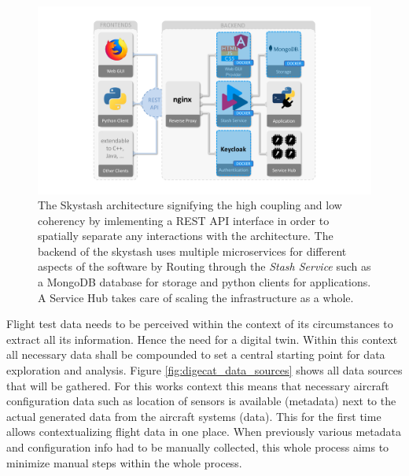 \begin{figure}[h]
    \centering
    \includegraphics[width=\textwidth]{03_figures/stash_architecture}
    \caption[The Skystash architecture \cite{arts_digital_2022}]{The Skystash architecture signifying the high coupling and low coherency by imlementing a REST API interface in order to spatially separate any interactions with the architecture. The backend of the skystash uses multiple microservices for different aspects of the software by Routing through the \textit{Stash Service} such as a MongoDB database for storage and python clients for applications. A Service Hub takes care of scaling the infrastructure as a whole. \cite{arts_digital_2022}}
    \label{fig:skystash_architecture}
\end{figure}

Flight test data needs to be perceived within the context of its circumstances to extract all its information. Hence the need for a digital twin. Within this context all necessary data shall be compounded to set a central starting point for data exploration and analysis. Figure \ref{fig:digecat_data_sources} shows all data sources that will be gathered. For this works context this means that necessary aircraft configuration data such as location of sensors is available (metadata) next to the actual generated data from the aircraft systems (data). This for the first time allows contextualizing flight data in one place. When previously various metadata and configuration info had to be manually collected, this whole process aims to minimize manual steps within the whole process. \cite{arts_digital_2022}

